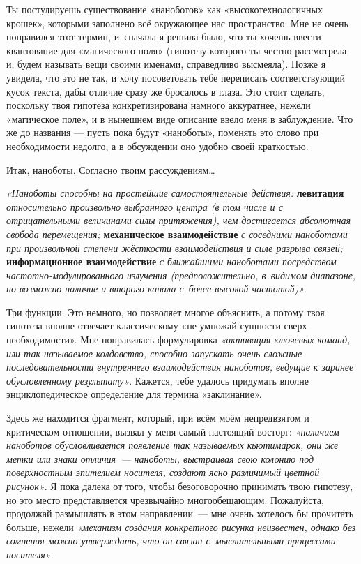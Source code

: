 \documentclass[fontsize=11pt,a5paper,titlepage=firstcover]{scrbook}
\begin{document}
Ты постулируешь существование «наноботов» как «высокотехнологичных крошек», которыми заполнено всё окружающее нас пространство. Мне не очень понравился этот термин, и~сначала я решила было, что ты хочешь ввести квантование для «магического поля» (гипотезу которого ты честно рассмотрела и, будем называть вещи своими именами, справедливо высмеяла). Позже я увидела, что это не так, и хочу посоветовать тебе переписать соответствующий кусок текста, дабы отличие сразу же бросалось в глаза. Это стоит сделать, поскольку твоя гипотеза конкретизирована намного аккуратнее, нежели «магическое поле», и в нынешнем виде описание ввело меня в заблуждение. Что же до названия --- пусть пока будут «наноботы», поменять это слово при необходимости недолго, а в обсуждении оно удобно своей краткостью.

Итак, наноботы. Согласно твоим рассуждениям{\ldots}

\emph{«Наноботы способны на простейшие самостоятельные действия:} \textbf{левитация} \emph{относительно произвольно выбранного центра (в том числе и с отрицательными величинами силы притяжения), чем достигается абсолютная свобода перемещения;} \textbf{механическое взаимодействие} \emph{с соседними наноботами при произвольной степени жёсткости взаимодействия и силе разрыва связей;} \textbf{информационное взаимодействие} \emph{с ближайшими наноботами посредством частотно-модулированного излучения (предположительно, в~видимом диапазоне, но возможно наличие и второго канала с~более высокой частотой)».}

Три функции. Это немного, но позволяет многое объяснить, а потому твоя гипотеза вполне отвечает классическому «не умножай сущности сверх необходимости». Мне понравилась формулировка \emph{«активация ключевых команд, или так называемое колдовство, способно запускать очень сложные последовательности внутреннего взаимодействия наноботов, ведущие к заранее обусловленному результату»}. Кажется, тебе удалось придумать вполне энциклопедическое определение для термина «заклинание».

Здесь же находится фрагмент, который, при всём моём непредвзятом и критическом отношении, вызвал у меня самый настоящий восторг: \emph{«наличием наноботов обусловливается появление так называемых кьютимарок, они же метки или знаки отличия~--- наноботы, выстраивая свою колонию под поверхностным эпителием носителя, создают ясно различимый цветной рисунок»}. Я пока далека от того, чтобы безоговорочно принимать твою гипотезу, но это место представляется чрезвычайно многообещающим. Пожалуйста, продолжай размышлять в этом направлении~--- мне очень хотелось бы прочитать больше, нежели \emph{«механизм создания конкретного рисунка неизвестен, однако без сомнения можно утверждать, что он связан с~мыслительными процессами носителя»}.
\end{document}
